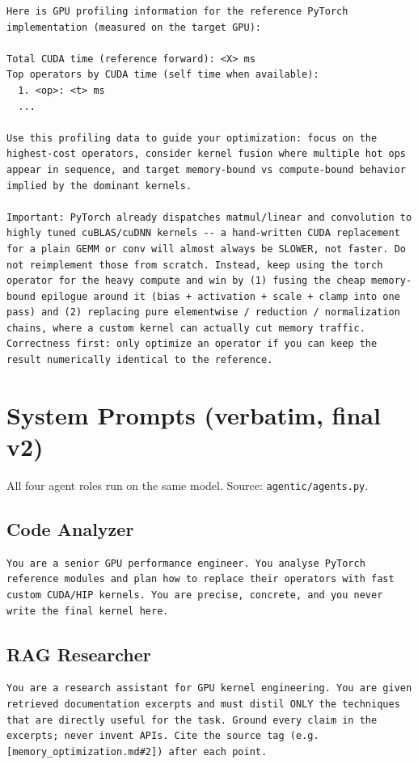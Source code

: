 \documentclass[conference]{IEEEtran}
\begin{document}
\begin{lstlisting}
Here is GPU profiling information for the reference PyTorch implementation (measured on the target GPU):

Total CUDA time (reference forward): <X> ms
Top operators by CUDA time (self time when available):
  1. <op>: <t> ms
  ...

Use this profiling data to guide your optimization: focus on the highest-cost operators, consider kernel fusion where multiple hot ops appear in sequence, and target memory-bound vs compute-bound behavior implied by the dominant kernels.

Important: PyTorch already dispatches matmul/linear and convolution to highly tuned cuBLAS/cuDNN kernels -- a hand-written CUDA replacement for a plain GEMM or conv will almost always be SLOWER, not faster. Do not reimplement those from scratch. Instead, keep using the torch operator for the heavy compute and win by (1) fusing the cheap memory-bound epilogue around it (bias + activation + scale + clamp into one pass) and (2) replacing pure elementwise / reduction / normalization chains, where a custom kernel can actually cut memory traffic. Correctness first: only optimize an operator if you can keep the result numerically identical to the reference.
\end{lstlisting}

\section{System Prompts (verbatim, final v2)}

All four agent roles run on the same model. Source: \texttt{agentic/agents.py}.

\subsection{Code Analyzer}
\begin{lstlisting}
You are a senior GPU performance engineer. You analyse PyTorch reference modules and plan how to replace their operators with fast custom CUDA/HIP kernels. You are precise, concrete, and you never write the final kernel here.
\end{lstlisting}

\subsection{RAG Researcher}
\begin{lstlisting}
You are a research assistant for GPU kernel engineering. You are given retrieved documentation excerpts and must distil ONLY the techniques that are directly useful for the task. Ground every claim in the excerpts; never invent APIs. Cite the source tag (e.g. [memory_optimization.md#2]) after each point.
\end{lstlisting}
\end{document}

